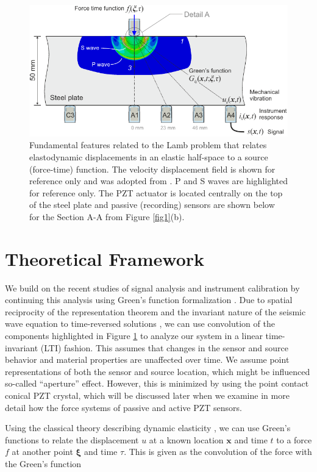\documentclass[preprint,3p, 11pt,authoryear]{elsarticle}
\begin{document}
\begin{figure}[h]
     	\centering
\includegraphics[scale= 1.0]{FIG2.pdf} 
\caption{Fundamental features related to the Lamb problem that relates elastodynamic displacements in an elastic half-space to a source (force-time) function. The velocity displacement field is shown for reference only and was adopted from \citet{Selvadurai2019}. P and S waves are highlighted for reference only. The PZT actuator is located centrally on the top of the steel plate and passive (recording) sensors are shown below for the Section A-A from Figure \ref{fig1}(b).}
	\label{fig2} 
\end{figure}


\section{Theoretical Framework}
\label{theo}

We build on the recent studies of signal analysis and instrument calibration by \citet{McLaksey2012} continuing this analysis using Green's function formalization \citep{Aki2002, Johnson1974}. Due to spatial reciprocity of the representation theorem \citep{Aki2002} and the invariant nature of the seismic wave equation to time-reversed solutions \citep{Fink1992}, we can use convolution of the components highlighted in Figure \ref{fig2} to analyze our system in a linear time-invariant (LTI) fashion. This assumes that changes in the sensor and source behavior and material properties are unaffected over time.  We assume point representations of both the sensor and source location, which might be influenced so-called ``aperture'' effect. However, this is minimized by using the point contact conical PZT crystal, which will be discussed later when we examine in more detail how the force systems of passive and active PZT sensors.

Using the classical theory describing dynamic elasticity \citep{Aki2002}, we can use Green's functions to relate the displacement $u$ at a known location $\mathbf{x}$ and time $t$ to a force $f$ at another point $\mathbf{\xi}$ and time $\tau$. This is given as the convolution of the force with the Green's function
\end{document}
